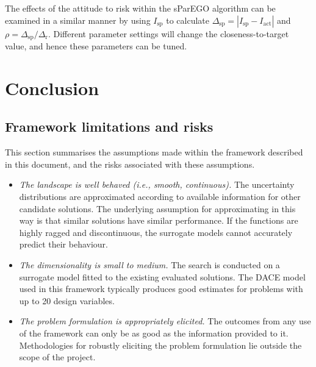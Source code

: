 \documentclass[a4paper]{article}
\newcommand{\brabs}[1]{\left\vert{#1}\right\vert} %
\begin{document}
The effects of the attitude to risk within the sParEGO algorithm can be examined in a similar manner by using $I_\text{sp}$ to calculate $\Delta_\text{sp} = \brabs{I_\text{sp}-I_\text{act}}$ and $\rho = \Delta_\text{sp} / \Delta_\text{r}$. Different parameter settings will change the closeness-to-target value, and hence these parameters can be tuned.


\section{Conclusion}
\label{sec:conclusion}

\subsection{Framework limitations and risks}
This section summarises the assumptions made within the framework described in this document, and the risks associated with these assumptions.
\begin{itemize}
	\item \emph{The landscape is well behaved (i.e., smooth, continuous).} The uncertainty distributions are approximated according to available information for other candidate solutions. The underlying assumption for approximating in this way is that similar solutions have similar performance. If the functions are highly ragged and discontinuous, the surrogate models cannot accurately predict their behaviour.
	\item \emph{The dimensionality is small to medium.} The search is conducted on a surrogate model fitted to the existing evaluated solutions. The DACE model used in this framework typically produces good estimates for problems with up to 20 design variables.
	\item \emph{The problem formulation is appropriately elicited.} The outcomes from any use of the framework can only be as good as the information provided to it. Methodologies for robustly eliciting the problem formulation lie outside the scope of the project.
\end{itemize}




\end{document}
